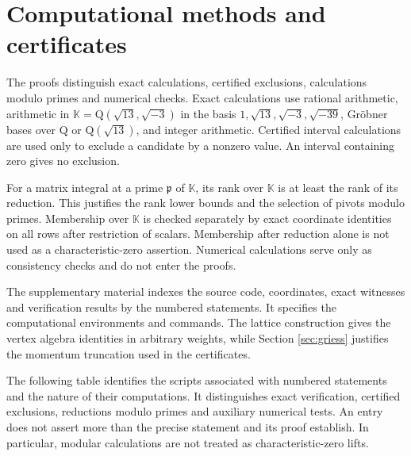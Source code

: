 \documentclass[leqno]{article}
\newcommand{\K}{\ensuremath{\mathbb{K}}}
\newcommand{\Q}{\mathrm{Q}}
\numberwithin{equation}{section}
\begin{document}
\appendix
\section{Computational methods and certificates}
\label{app:computations}

The proofs distinguish exact calculations, certified exclusions, calculations modulo primes and numerical checks. Exact calculations use rational arithmetic, arithmetic in $\K = \Q(\sqrt{13},\sqrt{-3})$ in the basis $1,\sqrt{13},\sqrt{-3},\sqrt{-39}$, Gröbner bases over $\Q$ or $\Q(\sqrt{13})$, and integer arithmetic. Certified interval calculations are used only to exclude a candidate by a nonzero value. An interval containing zero gives no exclusion.

For a matrix integral at a prime $\mathfrak p$ of $\K$, its rank over $\K$ is at least the rank of its reduction. This justifies the rank lower bounds and the selection of pivots modulo primes. Membership over $\K$ is checked separately by exact coordinate identities on all rows after restriction of scalars. Membership after reduction alone is not used as a characteristic-zero assertion. Numerical calculations serve only as consistency checks and do not enter the proofs.

The supplementary material indexes the source code, coordinates, exact witnesses and verification results by the numbered statements. It specifies the computational environments and commands. The lattice construction gives the vertex algebra identities in arbitrary weights, while Section \ref{sec:griess} justifies the momentum truncation used in the certificates.

The following table identifies the scripts associated with numbered statements and the nature of their computations. It distinguishes exact verification, certified exclusions, reductions modulo primes and auxiliary numerical tests. An entry does not assert more than the precise statement and its proof establish. In particular, modular calculations are not treated as characteristic-zero lifts.
\end{document}
